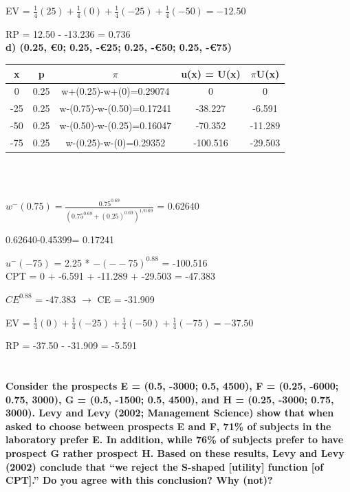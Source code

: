\documentclass{article}
\begin{document}
\vspace{1.5mm}

EV = $\frac{1}{4}(25)+\frac{1}{4}(0)+\frac{1}{4}(-25)+\frac{1}{4}(-50)= -12.50$

RP = 12.50 - -13.236 = 0.736 \\  
 
\textbf{ d) (0.25, €0; 0.25, -€25; 0.25, -€50; 0.25, -€75)}    

\vspace{2mm}

\begin{tabular}{|c|c|c|c|c|}
	\hline
	x  & p    & $\pi$                         & u(x) = U(x) & $\pi$U(x)  \\ \hline
	0 & 0.25 & w+(0.25)-w+(0)=0.29074    & 0      & 0 \\ \hline
	-25 & 0.25 & w-(0.75)-w-(0.50)=0.17241 & -38.227     & -6.591  \\ \hline
	-50 & 0.25 & w-(0.50)-w-(0.25)=0.16047 & -70.352      & -11.289  \\ \hline
	-75  & 0.25 & w-(0.25)-w-(0)=0.29352    & -100.516           & -29.503      \\ \hline
\end{tabular} \\ \\ 

\Large

$w^-(0.75) = \frac{0.75^{0.69}}{(0.75^{0.69}+(0.25)^{0.69})^{1/0.69}}$ = 0.62640 \\

\normalsize

0.62640-0.45399= 0.17241

$u^-(-75)$ = 2.25 * $-(--75)^{0.88}$ = -100.516 \\

CPT = 0 + -6.591 + -11.289 + -29.503 = -47.383

$CE^{0.88}$ = -47.383 $\rightarrow$ CE = -31.909

\vspace{1.5mm}

EV = $\frac{1}{4}(0)+\frac{1}{4}(-25)+\frac{1}{4}(-50)+\frac{1}{4}(-75)= -37.50$

RP = -37.50 - -31.909 = -5.591 \\  

\section{}
\textbf{Consider the prospects E = (0.5, -3000; 0.5, 4500), \linebreak F = (0.25, -6000; 0.75, 3000), G = (0.5, -1500; 0.5, 4500), and \linebreak H = (0.25, -3000; 0.75, 3000).   
Levy and Levy (2002; Management Science) show that when asked to choose between prospects E and F, 71\% of subjects in the laboratory prefer E. In addition, while 76\% of subjects prefer to have prospect G rather prospect H. Based on these results, Levy and Levy (2002) conclude that “we reject the S-shaped [utility] function [of CPT].”   
Do you agree with this conclusion? Why (not)? } \\
\end{document}
